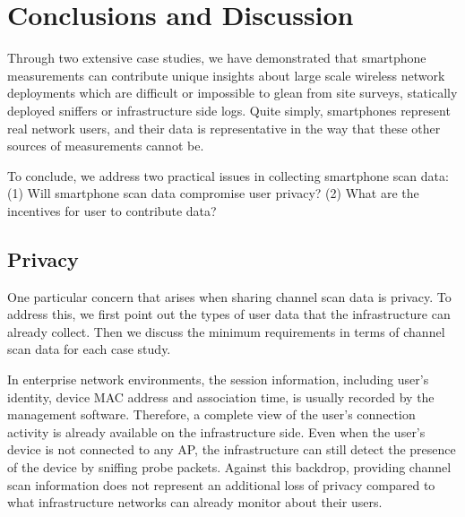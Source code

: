 \section{Conclusions and Discussion}
\label{sec:conclusion}

Through two extensive case studies, we have demonstrated that smartphone
measurements can contribute unique insights about large scale wireless network
deployments which are difficult or impossible to glean from site surveys,
statically deployed sniffers or infrastructure side logs. Quite simply,
smartphones represent real network users, and their data is representative in
the way that these other sources of measurements cannot be.

To conclude, we address two practical issues in collecting smartphone
scan data: (1) Will smartphone scan data compromise user privacy? (2) What
are the incentives for user to contribute data? 

\begin{comment}
\begin{table*}[t!]
  \centering
  \begin{tabular}{cccccccc}
    
  \end{tabular}
  \caption{\textbf{Summary of Data Required for Each Case Study.} $\times$: Not
  required. $\diamond$: Optional. $\surd$: Required.}
  \label{tab:privacy}
  \vspace*{\aftercaptiongap}
\end{table*}
\end{comment}

\subsection{Privacy}
\label{subsec:privacy}

One particular concern that arises when sharing channel scan data is privacy.
To address this, we first point out the types of user data that the
infrastructure can already collect. Then we discuss the minimum
requirements in terms of channel scan data for each case study.

In enterprise network environments, the \wifi{} session information,
including user's identity, device MAC address and association time, is usually
recorded by the management software. Therefore, a complete view of the user's
\wifi{} connection activity is already available on the infrastructure side.
Even when the user's device is not connected to any AP, the infrastructure
can still detect the presence of the device by sniffing probe
packets. Against this backdrop,
providing channel scan information does not represent an additional loss of
privacy compared to what infrastructure networks can already monitor about
their users.

